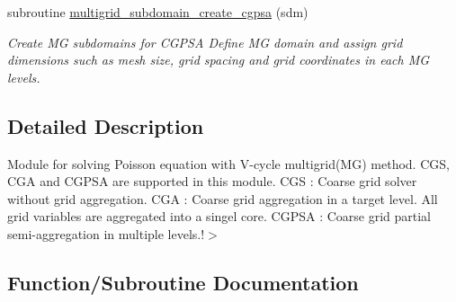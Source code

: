 \textbf{ }\par
\begin{DoxyCompactItemize}
\item 
subroutine \hyperlink{namespacemultigrid_aa2eb7c900fb5875f844c04c27c552373}{multigrid\+\_\+subdomain\+\_\+create\+\_\+cgpsa} (sdm)
\begin{DoxyCompactList}\small\item\em Create MG subdomains for C\+G\+P\+SA  Define MG domain and assign grid dimensions such as mesh size, grid spacing and grid coordinates in each MG levels. \end{DoxyCompactList}\end{DoxyCompactItemize}



\subsection{Detailed Description}
Module for solving Poisson equation with V-\/cycle multigrid(\+M\+G) method.  C\+GS, C\+GA and C\+G\+P\+SA are supported in this module. C\+GS \+: Coarse grid solver without grid aggregation. C\+GA \+: Coarse grid aggregation in a target level. All grid variables are aggregated into a singel core. C\+G\+P\+SA \+: Coarse grid partial semi-\/aggregation in multiple levels.!$>$ 

\subsection{Function/\+Subroutine Documentation}
\mbox{\label{namespacemultigrid_a4295ca0af002ede1dee98750922f1f60}} 
